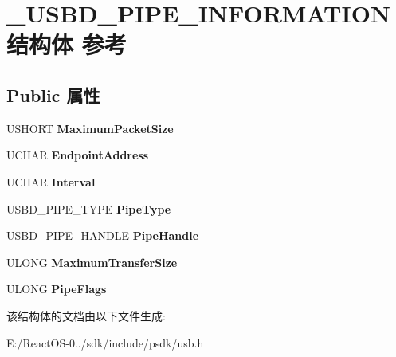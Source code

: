 \hypertarget{struct___u_s_b_d___p_i_p_e___i_n_f_o_r_m_a_t_i_o_n}{}\section{\+\_\+\+U\+S\+B\+D\+\_\+\+P\+I\+P\+E\+\_\+\+I\+N\+F\+O\+R\+M\+A\+T\+I\+O\+N结构体 参考}
\label{struct___u_s_b_d___p_i_p_e___i_n_f_o_r_m_a_t_i_o_n}
\subsection*{Public 属性}
\begin{DoxyCompactItemize}
\item 
\mbox{\label{struct___u_s_b_d___p_i_p_e___i_n_f_o_r_m_a_t_i_o_n_a3f895a7b1fa65d05933962663ec24fe5}} 
U\+S\+H\+O\+RT {\bfseries Maximum\+Packet\+Size}
\item 
\mbox{\label{struct___u_s_b_d___p_i_p_e___i_n_f_o_r_m_a_t_i_o_n_ab4eed18c9b90557f67acd5bdcc6796e0}} 
U\+C\+H\+AR {\bfseries Endpoint\+Address}
\item 
\mbox{\label{struct___u_s_b_d___p_i_p_e___i_n_f_o_r_m_a_t_i_o_n_afd35abedece8096d4bea21d56846d832}} 
U\+C\+H\+AR {\bfseries Interval}
\item 
\mbox{\label{struct___u_s_b_d___p_i_p_e___i_n_f_o_r_m_a_t_i_o_n_a9f60c7340c608f62bca611c990d3af2b}} 
U\+S\+B\+D\+\_\+\+P\+I\+P\+E\+\_\+\+T\+Y\+PE {\bfseries Pipe\+Type}
\item 
\mbox{\label{struct___u_s_b_d___p_i_p_e___i_n_f_o_r_m_a_t_i_o_n_ae04ebe701b7943cb2bac244a6fa4e3a8}} 
\hyperlink{interfacevoid}{U\+S\+B\+D\+\_\+\+P\+I\+P\+E\+\_\+\+H\+A\+N\+D\+LE} {\bfseries Pipe\+Handle}
\item 
\mbox{\label{struct___u_s_b_d___p_i_p_e___i_n_f_o_r_m_a_t_i_o_n_a7e0455f9c4860feb0ec4935b2649b6d7}} 
U\+L\+O\+NG {\bfseries Maximum\+Transfer\+Size}
\item 
\mbox{\label{struct___u_s_b_d___p_i_p_e___i_n_f_o_r_m_a_t_i_o_n_a4d2a515a6f4770b4e4dea8b936ec0f52}} 
U\+L\+O\+NG {\bfseries Pipe\+Flags}
\end{DoxyCompactItemize}


该结构体的文档由以下文件生成\+:\begin{DoxyCompactItemize}
\item 
E\+:/\+React\+O\+S-\/0../sdk/include/psdk/usb.\+h\end{DoxyCompactItemize}
